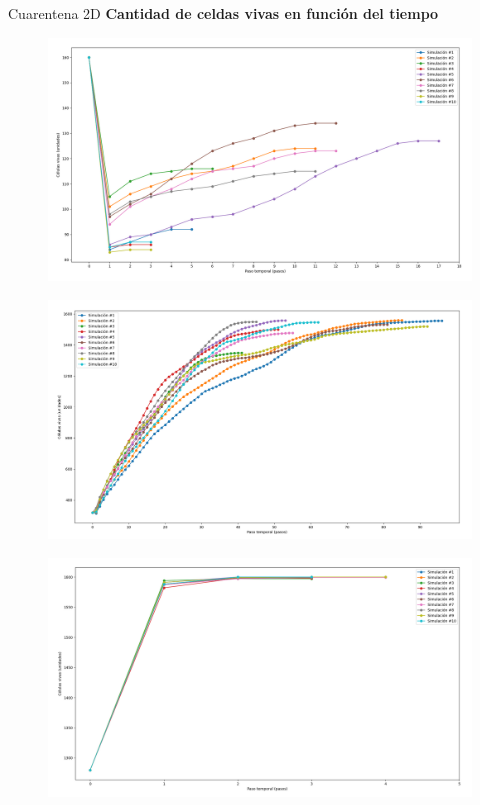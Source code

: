 \begin{frame}{Cuarentena 2D}
    \textcolor{hkustblue}\textbf{Cantidad de celdas vivas en función del tiempo}
    {\footnotesize
    \begin{multicols}{3}
        {
            \begin{figure}[H]
                \centering
                \includegraphics[width=0.8\linewidth]{pic/cuarentena2d/size_i10}
                \label{fig:cuarentena:size:i10}
            \end{figure}
        }

        {
            \begin{figure}[H]
                \centering
                \includegraphics[width=0.8\linewidth]{pic/cuarentena2d/size_i20}
                \label{fig:cuarentena:size:i20}
            \end{figure}
        }

        {
            \begin{figure}[H]
                \centering
                \includegraphics[width=0.8\linewidth]{pic/cuarentena2d/size_i80}
                \label{fig:cuarentena:size:i80}
            \end{figure}
        }
    \end{multicols}
    }
\end{frame}


